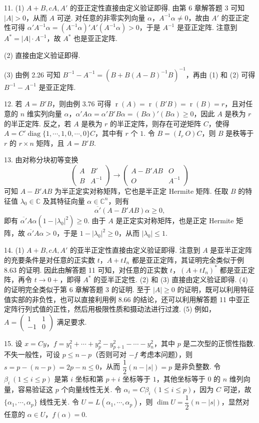 \documentclass[UTF8,12pt,a4paper,fontset=fandol]{ctexart}
\begin{document}
11. (1) $A+B,cA,A'$ 的亚正定性直接由定义验证即得. 由第 6 章解答题 3 可知 $|A|>0$，从而 $A$ 可逆. 对任意的非零实列向量 $\alpha$，$A^{-1}\alpha\ne 0$，故由 $A'$ 的亚正定性可得 $\alpha'A^{-1}\alpha=(A^{-1}\alpha)'A'(A^{-1}\alpha)>0$，于是 $A^{-1}$ 是亚正定阵. 注意到 $A^*=|A|\cdot A^{-1}$，故 $A^*$ 也是亚正定阵.

(2) 直接由定义验证即得.

(3) 由例 2.26 可知 $B^{-1}-A^{-1}=(B+B(A-B)^{-1}B)^{-1}$，再由 (1) 和 (2) 可得 $B^{-1}-A^{-1}$ 是亚正定阵.

12. 若 $A=B'B$，则由例 3.76 可得 $\operatorname{r}(A)=\operatorname{r}(B'B)=\operatorname{r}(B)=r$，且对任意的 $n$ 维实列向量 $\alpha$，$\alpha'A\alpha=\alpha'B'B\alpha=(B\alpha)'(B\alpha)\ge 0$，因此 $A$ 是秩为 $r$ 的半正定阵. 反之，若 $A$ 是秩为 $r$ 的半正定阵，则存在可逆矩阵 $C$，使得 $A=C'\operatorname{diag}\{1,\cdots,1,0,\cdots,0\}C$，其中有 $r$ 个 $1$. 令 $B=(I_r\ O)C$，则 $B$ 是秩等于 $r$ 的 $r\times n$ 矩阵，且 $A=B'B$.

13. 由对称分块初等变换
\[
\left(\begin{array}{cc}
A & B'\\
B & A^{-1}
\end{array}\right)
\to
\left(\begin{array}{cc}
A-B'AB & O\\
O & A^{-1}
\end{array}\right)
\]
可知 $A-B'AB$ 为半正定实对称矩阵，它也是半正定 Hermite 矩阵. 任取 $B$ 的特征值 $\lambda_0\in\mathbb{C}$ 及其特征向量 $\alpha\in\mathbb{C}^n$，则有
\[
\overline{\alpha'}(A-B'AB)\alpha\ge 0,
\]
即有 $\overline{\alpha'}A\alpha(1-|\lambda_0|^2)\ge 0$. 由于 $A$ 是正定实对称矩阵，也是正定 Hermite 矩阵，故 $\overline{\alpha'}A\alpha>0$，于是 $1-|\lambda_0|^2\ge 0$，从而 $|\lambda_0|\le 1$.

14. (1) $A+B,cA,A'$ 的亚半正定性直接由定义验证即得. 注意到 $A$ 是亚半正定阵的充要条件是对任意的正实数 $t$，$A+tI_n$ 都是亚正定阵，其证明完全类似于例 8.63 的证明. 因此由解答题 11 可知，对任意的正实数 $t$，$(A+tI_n)^*$ 都是亚正定阵，再令 $t\to 0+$，即得 $A^*$ 的亚半正定性. (2) 和 (3) 直接由定义验证即得. (4) 的证明完全类似于第 6 章解答题 3 的证明. 至于 $|A|\ge 0$ 的证明，既可以利用特征值实部的非负性，也可以直接利用例 8.66 的结论，还可以利用解答题 11 中亚正定阵行列式值的正性，然后用极限性质和摄动法进行过渡. (5) 例如，$A=\left(\begin{array}{cc}1&1\\ -1&0\end{array}\right)$ 满足要求.

15. 设 $x=Cy$，$f=y_1^2+\cdots+y_p^2-y_{p+1}^2-\cdots-y_n^2$，其中 $p$ 是二次型的正惯性指数. 不失一般性，可设 $p\le n-p$（否则可对 $-f$ 考虑本问题），则 $s=p-(n-p)=2p-n\le 0$，从而 $\dfrac12(n-|s|)=p$ 是非负整数. 令 $\beta_i\ (1\le i\le p)$ 是第 $i$ 坐标和第 $p+i$ 坐标等于 $1$，其他坐标等于 $0$ 的 $n$ 维列向量，容易验证这 $p$ 个向量线性无关. 令 $\alpha_i=C\beta_i\ (1\le i\le p)$，因为 $C$ 可逆，故 $\{\alpha_1,\cdots,\alpha_p\}$ 线性无关. 令 $U=L(\alpha_1,\cdots,\alpha_p)$，则 $\dim U=\dfrac12(n-|s|)$，显然对任意的 $\alpha\in U$，$f(\alpha)=0$.
\end{document}
